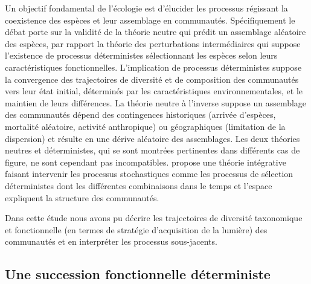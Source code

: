 \documentclass[
  11pt,
  french,
  A4paper,
  extrafontsizes,onecolumn,openright
  ]{memoir}
\begin{document}
Un objectif fondamental de l'écologie est d'élucider les processus
régissant la coexistence des espèces et leur assemblage en communautés.
Spécifiquement le débat porte sur la validité de la théorie neutre qui
prédit un assemblage aléatoire des espèces, par rapport la théorie des
perturbations intermédiaires qui suppose l'existence de processus
déterministes sélectionnant les espèces selon leurs caractéristiques
fonctionnelles. L'implication de processus déterministes suppose la
convergence des trajectoires de diversité et de composition des
communautés vers leur état initial, déterminés par les caractéristiques
environnementales, et le maintien de leurs différences. La théorie
neutre à l'inverse suppose un assemblage des communautés dépend des
contingences historiques (arrivée d'espèces, mortalité aléatoire,
activité anthropique) ou géographiques (limitation de la dispersion) et
résulte en une dérive aléatoire des assemblages. Les deux théories
neutres et déterministes, qui se sont montrées pertinentes dans
différents cas de figure, ne sont cependant pas incompatibles.
\autocite{Chave2004} propose une théorie intégrative faisant intervenir
les processus stochastiques comme les processus de sélection
déterministes dont les différentes combinaisons dans le temps et
l'espace expliquent la structure des communautés.

Dans cette étude nous avons pu décrire les trajectoires de diversité
taxonomique et fonctionnelle (en termes de stratégie d'acquisition de la
lumière) des communautés et en interpréter les processus sous-jacents.

\subsection{Une succession fonctionnelle
déterministe}\label{une-succession-fonctionnelle-deterministe}
\end{document}
